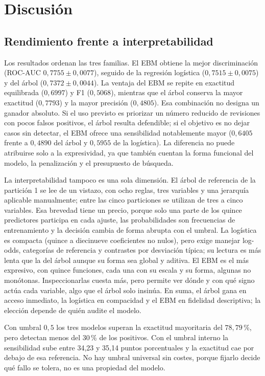 \section{Discusión}\label{sec:discussion}

\subsection{Rendimiento frente a interpretabilidad}

Los resultados ordenan las tres familias. El EBM obtiene la mejor discriminación (ROC-AUC $0{,}7755 \pm 0{,}0077$), seguido de la regresión logística ($0{,}7515 \pm 0{,}0075$) y del árbol ($0{,}7372 \pm 0{,}0044$). La ventaja del EBM se repite en exactitud equilibrada ($0{,}6997$) y F1 ($0{,}5068$), mientras que el árbol conserva la mayor exactitud ($0{,}7793$) y la mayor precisión ($0{,}4805$). Esa combinación no designa un ganador absoluto. Si el uso previsto es priorizar un número reducido de revisiones con pocos falsos positivos, el árbol resulta defendible; si el objetivo es no dejar casos sin detectar, el EBM ofrece una sensibilidad notablemente mayor ($0{,}6405$ frente a $0{,}4890$ del árbol y $0{,}5955$ de la logística). La diferencia no puede atribuirse solo a la expresividad, ya que también cuentan la forma funcional del modelo, la penalización y el presupuesto de búsqueda.

La interpretabilidad tampoco es una sola dimensión. El árbol de referencia de la partición 1 se lee de un vistazo, con ocho reglas, tres variables y una jerarquía aplicable manualmente; entre las cinco particiones se utilizan de tres a cinco variables. Esa brevedad tiene un precio, porque solo una parte de los quince predictores participa en cada ajuste, las probabilidades son frecuencias de entrenamiento y la decisión cambia de forma abrupta con el umbral. La logística es compacta (quince a diecinueve coeficientes no nulos), pero exige manejar log-odds, categorías de referencia y contrastes por desviación típica; su lectura es más lenta que la del árbol aunque su forma sea global y aditiva. El EBM es el más expresivo, con quince funciones, cada una con su escala y su forma, algunas no monótonas. Inspeccionarlas cuesta más, pero permite ver dónde y con qué signo actúa cada variable, algo que el árbol solo insinúa. En suma, el árbol gana en acceso inmediato, la logística en compacidad y el EBM en fidelidad descriptiva; la elección depende de quién audite el modelo.

Con umbral $0{,}5$ los tres modelos superan la exactitud mayoritaria del $78{,}79$\,\%, pero detectan menos del $30$\,\% de los positivos. Con el umbral interno la sensibilidad sube entre 34,23 y 35,14 puntos porcentuales y la exactitud cae por debajo de esa referencia. No hay umbral universal sin costes, porque fijarlo decide qué fallo se tolera, no es una propiedad del modelo.

